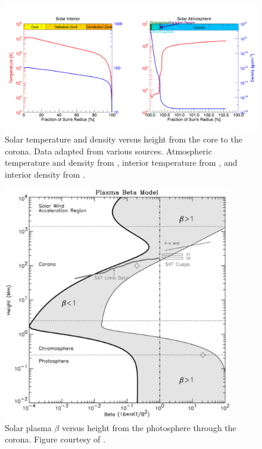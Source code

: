 \begin{figure}[!h]
    \begin{center}
	    \includegraphics[width=\textwidth]{Images/SolarTemperatureAndDensity.png}
    \end{center}
    \caption[Solar Temperature and Density Versus Height]{
        Solar temperature and density versus height from the core to the corona. Data adapted
        from various sources. Atmospheric temperature and density from \citet{Eddy1979}, 
        interior temperature from \citet{Lang2001}, and interior density from  
        \citet{Christensen-Dalsgaard1996}.         
    }
    \label{fig:suntemperaturedensity}
\end{figure}

\begin{figure}[!h]
    \begin{center}
	    \includegraphics[width=100mm]{Images/BetaVsHeight.png}
    \end{center}
    \caption[Solar Plasma $\beta$ Versus Height]{
        Solar plasma $\beta$ versus height from the photosphere through the corona. Figure courtesy of
        \citet{Gary2001}.         
    }
    \label{fig:betavsheight}
\end{figure}

